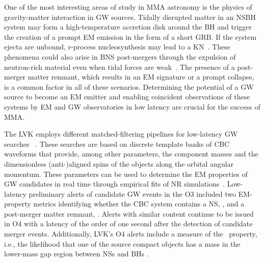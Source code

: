 One of the most interesting areas of study in \ac{MMA} astronomy is the physics of gravity-matter interaction in \ac{GW} sources. Tidally disrupted matter in an \ac{NSBH} system may form a
high-temperature accretion disk around the \ac{BH} and trigger the creation of a prompt \ac{EM} emission in the form of a short \ac{GRB}. If the system ejecta are unbound, r-process
nucleosynthesis may lead to a \ac{KN}~\cite{Lattimer:1974slx, Li:1998bw, Korobkin:2012uy, Barnes:2013wka, Tanaka:2013ana, Kasen:2014toa}. These phenomena could also arise in \ac{BNS}
post-mergers through the expulsion of neutron-rich material even when tidal forces are weak~\cite{LIGOScientific:2017ync, Arcavi:2017xiz, Coulter:2017wya, Kasliwal:2017ngb, Lipunov:2017dwd,
DES:2017kbs, Tanvir:2017pws}. The presence of a post-merger matter remnant, which results in an \ac{EM} signature or a prompt collapse, is a common factor in all of these scenarios. Determining
the potential of a \ac{GW} source to become an \ac{EM} emitter and enabling coincident observations of these systems by \ac{EM} and \ac{GW} observatories in low latency are crucial for the success
of \ac{MMA}.

The \ac{LVK} employs different matched-filtering pipelines for low-latency \ac{GW} searches~\cite{Sachdev:2020lfd,Nitz:2018rgo,Adams:2015ulm} . These searches are based on discrete template banks of \ac{CBC} waveforms that provide, among other parameters, the component masses and the dimensionless (anti-)aligned spins of the
objects along the orbital angular momentum. These parameters can be used to determine the \ac{EM} properties of \ac{GW} candidates in real time through empirical fits of \ac{NR}
simulations~\cite{Foucart:2012nc,Foucart:2018rjc}. Low-latency preliminary alerts of candidate \ac{GW} events in the \ac{O3} included two \ac{EM}-property metrics identifying whether the
\ac{CBC} system contains a \ac{NS}, \hasns, and a post-merger matter remnant, \hasrem. Alerts with similar content continue to be issued in \ac{O4} with a  latency of the order of
one second after the detection of candidate merger events.  Additionally, \ac{LVK}'s \ac{O4} alerts include a measure of the \hasgap\ property, i.e., the likelihood that one of the source
compact objects has a mass in the lower-mass gap region between \ac{NS}s and \ac{BH}s .

